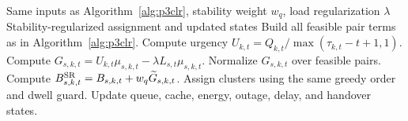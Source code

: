 \begin{algorithm}[!t]
\caption{\psr\ Stability-Regularized Scheduling}
\label{alg:p3csr}
\begin{algorithmic}[1]
\REQUIRE Same inputs as Algorithm~\ref{alg:p3clr}, stability weight $w_q$, load regularization $\lambda$
\ENSURE Stability-regularized assignment and updated states
\STATE Build all feasible pair terms as in Algorithm~\ref{alg:p3clr}.
    \STATE Compute urgency $U_{k,t}=Q_{k,t}/\max(\tau_{k,t}-t+1,1)$.
    \STATE Compute $G_{s,k,t}=U_{k,t}\mu_{s,k,t}-\lambda L_{s,t}\mu_{s,k,t}$.
    \STATE Normalize $G_{s,k,t}$ over feasible pairs.
    \STATE Compute $B^{\mathrm{SR}}_{s,k,t}=B_{s,k,t}+w_q\widetilde{G}_{s,k,t}$.
\ENDFOR
\STATE Assign clusters using the same greedy order and dwell guard.
\STATE Update queue, cache, energy, outage, delay, and handover states.
\end{algorithmic}
\end{algorithm}
